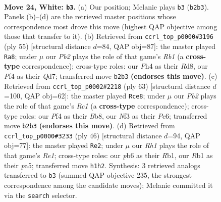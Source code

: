 \documentclass[11pt]{article}
\begin{document}
\begin{figure}[p]
\label{fig:thought-m44}
\end{figure}

\clearpage

\begin{figure}[p]\centering
\begin{subfigure}{0.46\textwidth}\centering
\resizebox{\linewidth}{!}{%
\newchessgame
\chessboard[
  setfen={rn2r1k1/2pnq1pp/1p2p3/p3Pp2/2pP1P1P/P4NNQ/1PPK2P1/1R5R w - - 0 24},
  showmover=false,
  pgfstyle=straightmove, color=movearrow, markmove={b2-b3}
]}
\caption{}
\end{subfigure}\hfill
\begin{subfigure}{0.46\textwidth}\centering
\resizebox{\linewidth}{!}{%
\newchessgame
\chessboard[
  setfen={1r1r4/3qn1k1/4np2/Pp1p2p1/2pP3p/P1N1PN1P/2Q2PP1/4RK1R b - - 0 28},
  showmover=false,
  pgfstyle=straightmove, color=movearrow, markmove={b8-a8}
]}
\caption{}
\end{subfigure}
\\[4pt]
\begin{subfigure}{0.46\textwidth}\centering
\resizebox{\linewidth}{!}{%
\newchessgame
\chessboard[
  setfen={1br2r2/1p2q3/p1pn1ppk/2Np4/PP1P2Pp/3NP2P/2R2PQ1/1R5K b - - 9 32},
  showmover=false,
  pgfstyle=straightmove, color=movearrow, markmove={c8-e8}
]}
\caption{}
\end{subfigure}\hfill
\begin{subfigure}{0.46\textwidth}\centering
\resizebox{\linewidth}{!}{%
\newchessgame
\chessboard[
  setfen={5r1k/1p2nr1p/1npq1p2/p2p2pP/P2P4/2NQPNP1/1P3PK1/1R2R3 w - - 2 24},
  showmover=false,
  pgfstyle=straightmove, color=movearrow, markmove={e1-e2}
]}
\caption{}
\end{subfigure}
\caption{\textbf{Move 24, White: \texttt{b3}.} (a) Our position; Melanie plays \texttt{b3} (\texttt{b2b3}). Panels (b)--(d) are the retrieved master positions whose correspondence most drove this move (highest QAP objective among those that transfer to it). (b) Retrieved from \texttt{ccrl\_top\_p0000\#3196} (ply 55) [structural distance $d$=84, QAP obj=87]: the master played \texttt{Ra8}; under $\mu$ our \emph{Pb2} plays the role of that game's \emph{Rb1} (a \textbf{cross-type} correspondence); cross-type roles: our \emph{P}h4 as their \emph{R}d8, our \emph{P}f4 as their \emph{Q}d7; transferred move \texttt{b2b3} \textbf{(endorses this move)}. (c) Retrieved from \texttt{ccrl\_top\_p0002\#2218} (ply 63) [structural distance $d$=100, QAP obj=62]: the master played \texttt{Rce8}; under $\mu$ our \emph{Pb2} plays the role of that game's \emph{Rc1} (a \textbf{cross-type} correspondence); cross-type roles: our \emph{P}f4 as their \emph{B}b8, our \emph{N}f3 as their \emph{P}c6; transferred move \texttt{b2b3} \textbf{(endorses this move)}. (d) Retrieved from \texttt{ccrl\_top\_p0000\#3233} (ply 46) [structural distance $d$=94, QAP obj=77]: the master played \texttt{Re2}; under $\mu$ our \emph{Rh1} plays the role of that game's \emph{Re1}; cross-type roles: our \emph{p}b6 as their \emph{R}b1, our \emph{R}b1 as their \emph{p}a5; transferred move \texttt{h1h2}. Synthesis: 3 retrieved analogs transferred to \texttt{b3} (summed QAP objective 235, the strongest correspondence among the candidate moves); Melanie committed it via the \texttt{search} selector.}

\end{figure}
\end{document}

